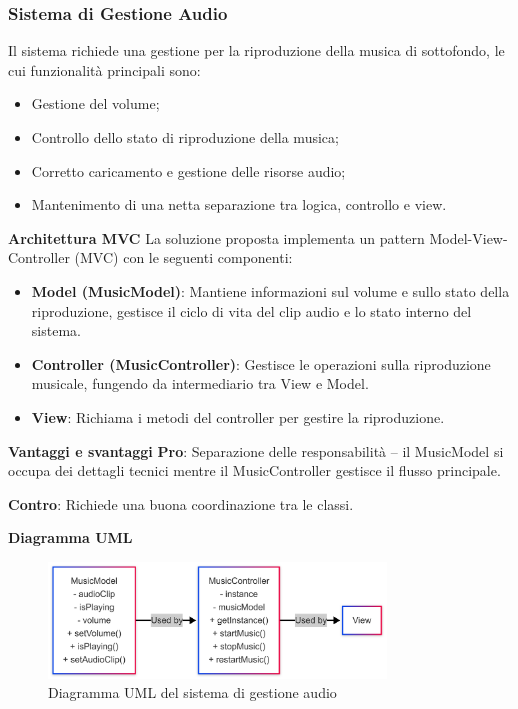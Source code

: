 \documentclass[a4paper,12pt]{report}
\begin{document}
\subsubsection{Sistema di Gestione Audio}
Il sistema richiede una gestione per la riproduzione della musica di sottofondo, le cui funzionalità principali sono:
\begin{itemize}
    \item Gestione del volume;
    \item Controllo dello stato di riproduzione della musica;
    \item Corretto caricamento e gestione delle risorse audio;
    \item Mantenimento di una netta separazione tra logica, controllo e view.
\end{itemize}

\textbf{Architettura MVC}\newline
La soluzione proposta implementa un pattern Model-View-Controller (MVC) con le seguenti componenti:
\begin{itemize}
    \item \textbf{Model (MusicModel)}: Mantiene informazioni sul volume e sullo stato della riproduzione, gestisce il ciclo di vita del clip audio e lo stato interno del sistema.
    \item \textbf{Controller (MusicController)}: Gestisce le operazioni sulla riproduzione musicale, fungendo da intermediario tra View e Model.
    \item \textbf{View}: Richiama i metodi del controller per gestire la riproduzione.
\end{itemize}

\textbf{Vantaggi e svantaggi}\newline
\textbf{Pro}: Separazione delle responsabilità – il MusicModel si occupa dei dettagli tecnici mentre il MusicController gestisce il flusso principale.

\textbf{Contro}: Richiede una buona coordinazione tra le classi.

\textbf{Diagramma UML}\newline
\begin{figure}[h]
    \centering 
    \includegraphics[width=0.8\textwidth]{img/uml_diagram.png}
    \caption{Diagramma UML del sistema di gestione audio}
    \label{fig:uml}
\end{figure}
\end{document}
